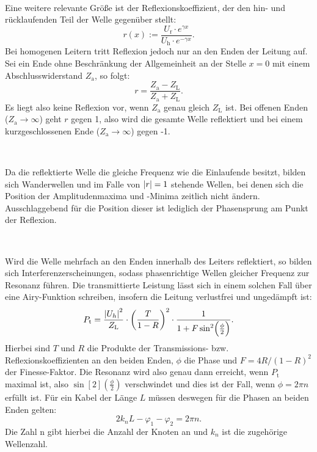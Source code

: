 	\
	
	Eine weitere relevante Größe ist der Reflexionskoeffizient, der den hin- und rücklaufenden Teil der Welle gegenüber stellt:
	\begin{equation}
		r(x) := \frac{U_\text{r}\cdot e^{\gamma x}}{U_\text{h}\cdot e^{-\gamma x}}.
	\end{equation} 
	Bei homogenen Leitern tritt Reflexion jedoch nur an den Enden der Leitung auf.
	Sei ein Ende ohne Beschränkung der Allgemeinheit an der Stelle $x = 0$ mit einem Abschlusswiderstand $Z_\text{a}$, so folgt:
	\begin{equation}
		r = \frac{Z_\text{a}-Z_\text{L}}{Z_\text{a}+Z_\text{L}}.
	\end{equation}
	Es liegt also keine Reflexion vor, wenn $Z_\text{a}$ genau gleich $ Z_\text{L}$ ist.
	Bei offenen Enden ($Z_\text{a} \rightarrow \infty$) geht $r$ gegen 1, also wird die gesamte Welle reflektiert und bei einem kurzgeschlossenen Ende ($Z_\text{a} \rightarrow \infty$) gegen -1.
	
	\
	
	Da die reflektierte Welle die gleiche Frequenz wie die Einlaufende besitzt, bilden sich Wanderwellen und im Falle von $\abs{r} = 1$ stehende Wellen, bei denen sich die Position der Amplitudenmaxima und -Minima zeitlich nicht ändern.
	Ausschlaggebend für die Position dieser ist lediglich der Phasensprung am Punkt der Reflexion.
	
	\
	
	Wird die Welle mehrfach an den Enden innerhalb des Leiters reflektiert, so bilden sich Interferenzerscheinungen, sodass phasenrichtige Wellen gleicher Frequenz zur Resonanz führen.
	Die transmittierte Leistung lässt sich in einem solchen Fall über eine Airy-Funktion schreiben, insofern die Leitung verlustfrei und ungedämpft ist:
	\begin{equation}
		P_\text{t} = \frac{\abs{U_h}^2}{Z_\text{L}} \cdot \left(\frac{T}{1-R}\right)^2 \cdot \frac{1}{1 + F\sin[2](\frac{\phi}{2})}. 
	\end{equation}  
	Hierbei sind $T$ und $R$ die Produkte der Transmissions- bzw. Reflexionskoeffizienten an den beiden Enden, $\phi$ die Phase und $F = 4R / (1-R)^2$ der Finesse-Faktor.
	Die Resonanz wird also genau dann erreicht, wenn $P_\text{t}$ maximal ist, also $\sin[2](\frac{\phi}{2})$ verschwindet und dies ist der Fall, wenn $\phi = 2\pi n$ erfüllt ist.
	Für ein Kabel der Länge $L$ müssen deswegen für die Phasen an beiden Enden gelten:
	\begin{equation}
		2k_n L - \varphi_1 - \varphi_2 = 2\pi n.
	\end{equation}
	Die Zahl n gibt hierbei die Anzahl der Knoten an und $k_n$ ist die zugehörige Wellenzahl.

